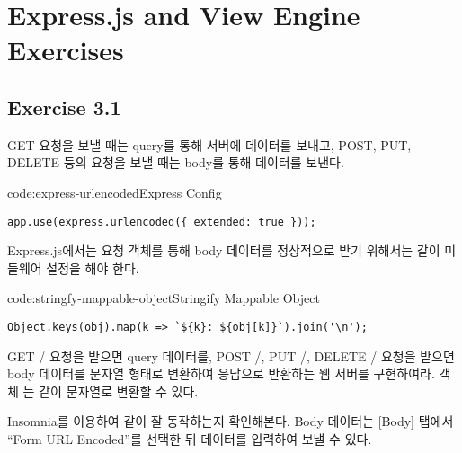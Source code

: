 \section{Express.js and View Engine Exercises}\label{sect:express-js-and-view-engine-exercises}

\subsection*{Exercise 3.1}

GET 요청을 보낼 때는 query를 통해 서버에 데이터를 보내고, POST, PUT, DELETE 등의 요청을 보낼 때는 body를 통해 데이터를 보낸다.

\begin{codeenv}{code:express-urlencoded}{Express  Config}\begin{verbatim}
app.use(express.urlencoded({ extended: true }));
\end{verbatim}
\end{codeenv}

Express.js에서는 요청 객체를 통해 body 데이터를 정상적으로 받기 위해서는 \와 같이 미들웨어 설정을 해야 한다.

\begin{codeenv}{code:stringfy-mappable-object}{Stringify Mappable Object}\begin{verbatim}
Object.keys(obj).map(k => `${k}: ${obj[k]}`).join('\n');
\end{verbatim}
\end{codeenv}

GET / 요청을 받으면 query 데이터를, POST /, PUT /, DELETE / 요청을 받으면 body 데이터를 문자열 형태로 변환하여 응답으로 반환하는 웹 서버를 구현하여라. 객체 는 \와 같이 문자열로 변환할 수 있다.


Insomnia를 이용하여 \와 같이 잘 동작하는지 확인해본다. Body 데이터는 [Body] 탭에서 ``Form URL Encoded''를 선택한 뒤 데이터를 입력하여 보낼 수 있다.
\newpage

